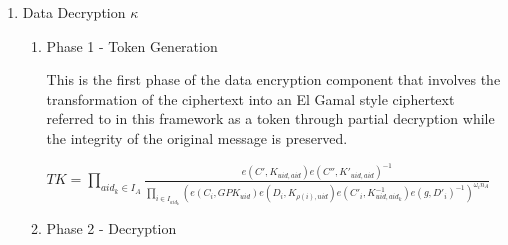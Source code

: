 \begin{enumerate}
	To encrypt the content key $\kappa_{i}$, the algorithm chooses a random element $ s \in Z_{p} $ which is used as the random encryption exponent. It then selects a random vector $ \vec{v} = (s, y_{2},\ldots,y_{n}) \in Z_{p} $ where $ y_{2},\ldots,y_{n} $ are used to share the encryption exponent s. It then computes $ \forall 1 \leq i \leq \ell: \lambda_{i} = \vec{v}.M_{i} $ where $ M_{i} $ is the vector corresponding to the i-th row of M. It then randomly selects $ r_{1},r_{2},\ldots,r_{\ell} $ and computes the ciphertext as
	
	$ CT_{K_{i}} = (C = K_{i}.(\prod\limits_{aid_{k} \in I_{A}}PK_{aid_{k}})^{s}, C' = g^{s}, C'' = g^{bs},	\forall 1 \leq i \leq \ell, \rho(i) \in X_{aid_{k}} \colon C_{i} = g^{a\lambda_{i}.(PK_{i,\rho(i)})^{-r_{i}}}, C'_{i} = g^{r_{i}},	D_{i} = g^{\frac{r_{i}}{\beta_{aid_k}}}, D'_{i} = (PK_{2,\rho_{(i)}})^{r_{i}}) $
	
	Then the encrypted data is uploaded to the cloud server by the owner.
	
	\item Data Decryption
	$\kappa$
	\begin{enumerate}
		
		\item Phase 1 - Token Generation
		
		
		This is the first phase of the data encryption component that involves the transformation of the ciphertext into an El Gamal style ciphertext referred to in this framework as a token through partial decryption while the integrity of the original message is preserved.
		
		$TK = \prod\limits_{aid_{k} \in I_{A}} \frac{e(C', K_{uid,aid})e(C'', K'_{uid,aid})^{-1}}{\prod\limits_{i \in I_{aid_k}}(e(C_i, GPK_{uid})e(D_i, K_{\rho(i),uid})e(C'_i, K_{uid,aid_k}^{-1})e(g, D'_i)^{-1})^{\omega_{i}n_A}}$
		
		\item Phase 2 - Decryption
		
	\end{enumerate}
	
\end{enumerate}

